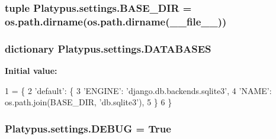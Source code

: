\subsubsection[{B\+A\+S\+E\+\_\+\+D\+I\+R}]{\setlength{\rightskip}{0pt plus 5cm}tuple Platypus.\+settings.\+B\+A\+S\+E\+\_\+\+D\+I\+R = os.\+path.\+dirname(os.\+path.\+dirname(\+\_\+\+\_\+file\+\_\+\+\_\+))}\label{namespace_platypus_1_1settings_ab0d13a750bebbc2d9e19f32adc2ff749}
\subsubsection[{D\+A\+T\+A\+B\+A\+S\+E\+S}]{\setlength{\rightskip}{0pt plus 5cm}dictionary Platypus.\+settings.\+D\+A\+T\+A\+B\+A\+S\+E\+S}\label{namespace_platypus_1_1settings_a52c253859b1798aee0972f29f3c94f00}
{\bfseries Initial value\+:}
\begin{DoxyCode}
1 = \{
2     \textcolor{stringliteral}{'default'}: \{
3         \textcolor{stringliteral}{'ENGINE'}: \textcolor{stringliteral}{'django.db.backends.sqlite3'},
4         \textcolor{stringliteral}{'NAME'}: os.path.join(BASE\_DIR, \textcolor{stringliteral}{'db.sqlite3'}),
5     \}
6 \}
\end{DoxyCode}
\subsubsection[{D\+E\+B\+U\+G}]{\setlength{\rightskip}{0pt plus 5cm}Platypus.\+settings.\+D\+E\+B\+U\+G = True}\label{namespace_platypus_1_1settings_a805959f406c1ab783912dca1bf4f9b4d}
